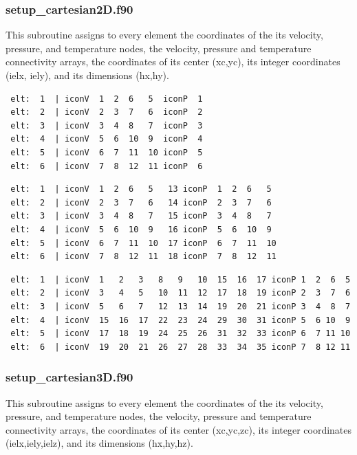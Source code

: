  \subsubsection{setup\_cartesian2D.f90}
 This subroutine assigns to every element the coordinates of the its velocity, pressure,
 and temperature nodes, the velocity, pressure and temperature connectivity arrays,
 the coordinates of its center (xc,yc), its integer coordinates (ielx, iely),
 and its dimensions (hx,hy).
 \begin{center}
 
 \end{center}
 \begin{verbatim}
 elt:  1  | iconV  1  2  6   5  iconP  1
 elt:  2  | iconV  2  3  7   6  iconP  2
 elt:  3  | iconV  3  4  8   7  iconP  3
 elt:  4  | iconV  5  6  10  9  iconP  4
 elt:  5  | iconV  6  7  11  10 iconP  5
 elt:  6  | iconV  7  8  12  11 iconP  6
 \end{verbatim}
 \begin{center}
 
 \end{center}
 \begin{verbatim}
 elt:  1  | iconV  1  2  6   5   13 iconP  1  2  6   5
 elt:  2  | iconV  2  3  7   6   14 iconP  2  3  7   6
 elt:  3  | iconV  3  4  8   7   15 iconP  3  4  8   7
 elt:  4  | iconV  5  6  10  9   16 iconP  5  6  10  9
 elt:  5  | iconV  6  7  11  10  17 iconP  6  7  11  10
 elt:  6  | iconV  7  8  12  11  18 iconP  7  8  12  11
 \end{verbatim}
 \begin{center}
 
 \end{center}
 \begin{verbatim}
 elt:  1  | iconV  1   2   3   8   9   10  15  16  17 iconP 1  2  6  5
 elt:  2  | iconV  3   4   5   10  11  12  17  18  19 iconP 2  3  7  6
 elt:  3  | iconV  5   6   7   12  13  14  19  20  21 iconP 3  4  8  7
 elt:  4  | iconV  15  16  17  22  23  24  29  30  31 iconP 5  6 10  9
 elt:  5  | iconV  17  18  19  24  25  26  31  32  33 iconP 6  7 11 10
 elt:  6  | iconV  19  20  21  26  27  28  33  34  35 iconP 7  8 12 11
 \end{verbatim}
 \subsubsection{setup\_cartesian3D.f90}
 This subroutine assigns to every element the coordinates of the its velocity, pressure,
 and temperature nodes, the velocity, pressure and temperature connectivity arrays,
 the coordinates of its center (xc,yc,zc), its integer coordinates (ielx,iely,ielz),
 and its dimensions (hx,hy,hz).
